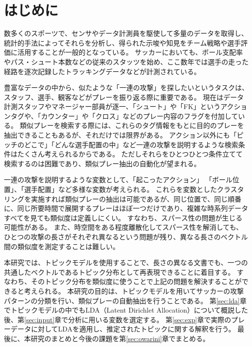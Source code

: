 \section{はじめに}
\label{sec:hajimeni}

数多くのスポーツで、センサやデータ計測員を駆使して多量のデータを取得し、統計的手法によってそれらを分析し、得られた示唆や知見をチーム戦略や選手評価に活用することが一般的となっている。
サッカーにおいても、ボール支配率やパス・シュート本数などの従来のスタッツを始め、ここ数年では選手の走った経路を逐次記録したトラッキングデータなどが計測されている\cite{foot}。


豊富なデータの中から、似たような「一連の攻撃」を探したいというタスクは、スタッフ、選手、観客などがプレーを振り返る際に重要である。
現在はデータ計測スタッフやマネージャー部員が逐一、「シュート」や「FK」というアクションタグや、「カウンター」や「クロス」などのプレー内容のフラグを付加している。
類似プレーを検索する際には、これらのタグ情報をもとに目的のプレーを抽出できることもあるが、それだけでは限界がある。
アクション以外にも「ピッチのどこで」「どんな選手配置の中」など一連の攻撃を説明するような検索条件はたくさん考えられるからである。
ただしそれらをひとつひとつ条件立てて検索するのは困難であり、類似プレー抽出の自動化が望まれる。


一連の攻撃を説明するような変数として、「起こったアクション」 「ボール位置」、「選手配置」など多様な変数が考えられる。
これらを変数としたクラスタリングを実施すれば類似プレーの抽出は可能であるが、同じ位置で、同じ順番に、同じ所要時間で展開するプレーはほぼ一つだけであり、複雑な時系列データすべてを見ても類似度は定義しにくい。
すなわち、スパース性の問題が生じる可能性がある。
また、時空間をある程度離散化してスパース性を解消しても、ひとつの攻撃の長さがそれぞれ異なるという問題が残り、異なる長さのベクトル間の類似度を測定することは難しい。

本研究では、トピックモデルを使用することで、長さの異なる文書でも、一つの共通したベクトルであるトピック分布として再表現できることに着目する。
すなわち、そのトピック分布を類似度に使うことで上記の問題を解決することができると考えられる。
本研究の目的は、トピックモデルを用いてサッカーの攻撃パターンの分類を行い、類似プレーの自動抽出を行うことである。
第\ref{sec:lda}章でトピックモデルの中でもLDA（Latent Dirichlet Allocation）について概説した後、第\ref{sec:input}章で分析に用いる変数を選定する。
第\ref{sec:exp}章で実際のプレーデータに対してLDAを適用し、推定されたトピックに関する解釈を行う。
最後に、本研究のまとめと今後の課題を第\ref{sec:owarini}章でまとめる。

